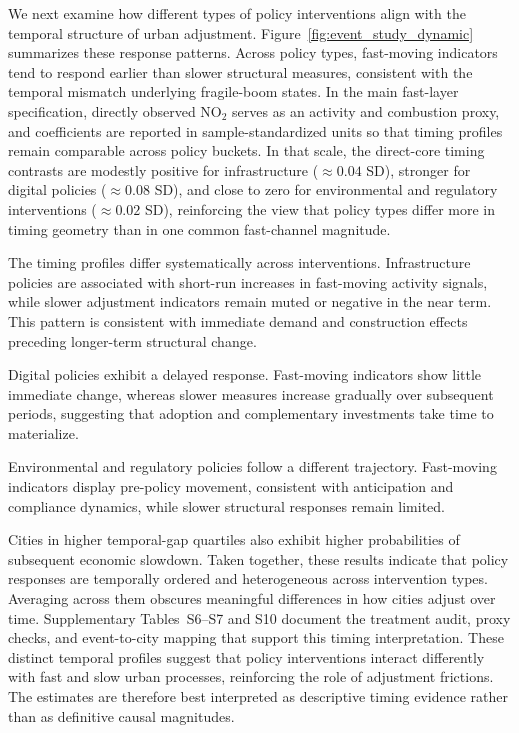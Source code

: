 \documentclass[oneside,pdflatex,sn-nature]{sn-jnl}
\begin{document}
We next examine how different types of policy interventions align with the temporal structure of urban adjustment. Figure~\ref{fig:event_study_dynamic} summarizes these response patterns. Across policy types, fast-moving indicators tend to respond earlier than slower structural measures, consistent with the temporal mismatch underlying fragile-boom states. In the main fast-layer specification, directly observed NO$_2$ serves as an activity and combustion proxy, and coefficients are reported in sample-standardized units so that timing profiles remain comparable across policy buckets. In that scale, the direct-core timing contrasts are modestly positive for infrastructure ($\approx 0.04$ SD), stronger for digital policies ($\approx 0.08$ SD), and close to zero for environmental and regulatory interventions ($\approx 0.02$ SD), reinforcing the view that policy types differ more in timing geometry than in one common fast-channel magnitude.

The timing profiles differ systematically across interventions. Infrastructure policies are associated with short-run increases in fast-moving activity signals, while slower adjustment indicators remain muted or negative in the near term. This pattern is consistent with immediate demand and construction effects preceding longer-term structural change.

Digital policies exhibit a delayed response. Fast-moving indicators show little immediate change, whereas slower measures increase gradually over subsequent periods, suggesting that adoption and complementary investments take time to materialize.

Environmental and regulatory policies follow a different trajectory. Fast-moving indicators display pre-policy movement, consistent with anticipation and compliance dynamics, while slower structural responses remain limited.

Cities in higher temporal-gap quartiles also exhibit higher probabilities of subsequent economic slowdown. Taken together, these results indicate that policy responses are temporally ordered and heterogeneous across intervention types. Averaging across them obscures meaningful differences in how cities adjust over time. Supplementary Tables~S6--S7 and S10 document the treatment audit, proxy checks, and event-to-city mapping that support this timing interpretation. These distinct temporal profiles suggest that policy interventions interact differently with fast and slow urban processes, reinforcing the role of adjustment frictions. The estimates are therefore best interpreted as descriptive timing evidence rather than as definitive causal magnitudes.
\end{document}
